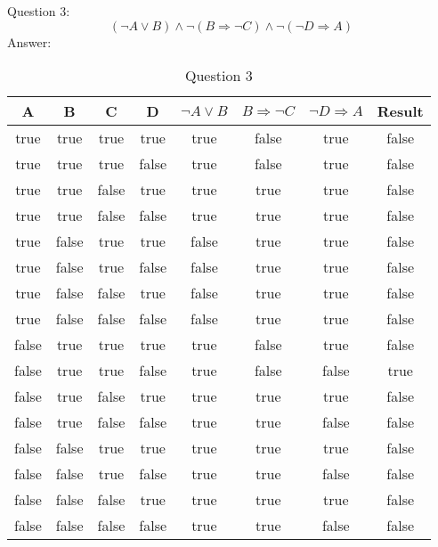 \documentclass[12pt, a4paper]{report}
\begin{document}
Question 3:
\begin{equation}
    (\neg A \vee B) \wedge \neg (B \Rightarrow \neg C) \wedge \neg (\neg D \Rightarrow A)
\end{equation}
Answer:
\begin{table}[h]
    \centering
    \caption{Question 3}
    \begin{tabular}{|c|c|c|c|c|c|c|c|}
    \hline
    A & B & C & D & $\neg A \vee B$ & $B \Rightarrow \neg C$ & $\neg D \Rightarrow A$ & Result \\
    \hline
    true & true & true & true & true & false & true & false \\
    \hline
    true & true & true & false & true & false & true & false \\
    \hline
    true & true & false & true & true & true & true & false \\
    \hline
    true & true & false & false & true & true & true & false \\
    \hline
    true & false & true & true & false & true & true & false \\
    \hline
    true & false & true & false & false & true & true & false \\
    \hline
    true & false & false & true & false & true & true & false \\
    \hline
    true & false & false & false & false & true & true & false \\
    \hline
    false & true & true & true & true & false & true & false \\
    \hline
    false & true & true & false & true & false & false & true \\
    \hline
    false & true & false & true & true & true & true & false \\
    \hline
    false & true & false & false & true & true & false & false \\
    \hline
    false & false & true & true & true & true & true & false \\
    \hline
    false & false & true & false & true & true & false & false \\
    \hline
    false & false & false & true & true & true & true & false \\
    \hline
    false & false & false & false & true & true & false & false \\
    \hline
    \end{tabular}
\end{table}
\end{document}
